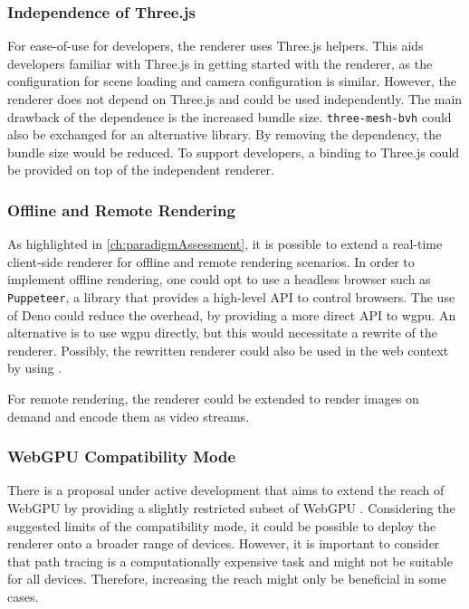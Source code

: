 \subsubsection*{Independence of Three.js}

For ease-of-use for developers, the renderer uses \gls{Three.js} helpers. This aids developers familiar with \gls{Three.js} in getting started with the renderer, as the configuration for scene loading and camera configuration is similar. However, the renderer does not depend on \gls{Three.js} and could be used independently. The main drawback of the dependence is the increased bundle size. \texttt{three-mesh-bvh} \cite{threeMeshBvh} could also be exchanged for an alternative library. By removing the dependency, the bundle size would be reduced. To support developers, a binding to \gls{Three.js} could be provided on top of the independent renderer.

\subsubsection*{Offline and Remote Rendering}

As highlighted in \autoref{ch:paradigmAssessment}, it is possible to extend a real-time client-side renderer for offline and remote rendering scenarios. In order to implement offline rendering, one could opt to use a headless browser such as \texttt{Puppeteer}, a  library that provides a high-level \gls{API} to control browsers. The use of \gls{Deno} could reduce the overhead, by providing a more direct \gls{API} to \gls{wgpu}. An alternative is to use \gls{wgpu} directly, but this would necessitate a rewrite of the renderer. Possibly, the rewritten renderer could also be used in the web context by using .

For remote rendering, the renderer could be extended to render images on demand and encode them as video streams.

\subsubsection*{WebGPU Compatibility Mode}

There is a proposal under active development that aims to extend the reach of \gls{WebGPU} by providing a slightly restricted subset of \gls{WebGPU} \cite{WebGPUCompatibilityModeProposal}. Considering the suggested limits of the compatibility mode, it could be possible to deploy the renderer onto a broader range of devices. However, it is important to consider that path tracing is a computationally expensive task and might not be suitable for all devices. Therefore, increasing the reach might only be beneficial in some cases.

